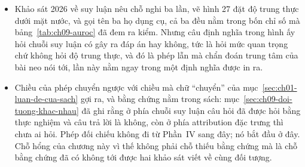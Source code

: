 \begin{tomtat}
\begin{itemize}
khác, gọi tên một mô hình khác với hình của chính nó, và không đơn điệu theo quy
mô ở đúng chỗ hai mô hình bị xếp chung nhóm.
  \item Khảo sát 2026 về suy luận nêu chỗ nghi ba lần, vẽ hình 27 đặt độ trung
thực dưới mặt nước, và gọi tên ba họ dụng cụ, cả ba đều nằm trong bốn chỉ số mà
bảng~\ref{tab:ch09-auroc} đã đem ra kiểm. Nhưng câu định nghĩa trong hình ấy hỏi
chuỗi suy luận có gây ra đáp án hay không, tức là hỏi mức quan trọng chứ không
hỏi độ trung thực, và đó là phép lẫn mà chẩn đoán trung tâm của bài neo nói tới,
lần này nằm ngay trong một định nghĩa được in ra.
  \item Chiều của phép chuyển ngược với chiều mà chữ \enquote{chuyển} của
mục~\ref{sec:ch01-luan-de-cua-sach} gợi ra, và bằng chứng nằm trong sách:
mục~\ref{sec:ch09-doi-tuong-khac-nhau} đã ghi rằng ở phía
chuỗi suy luận câu hỏi đã được hỏi bằng thực nghiệm và câu trả lời là không, còn
ở phía attribution đặc trưng thì chưa ai hỏi. Phép đối chiếu không đi từ Phần~IV
sang đây; nó bắt đầu ở đây. Chỗ hổng của chương này vì thế không phải chỗ thiếu
bằng chứng mà là chỗ bằng chứng đã có không tới được hai khảo sát viết về cùng
đối tượng.
\end{itemize}
\end{tomtat}

